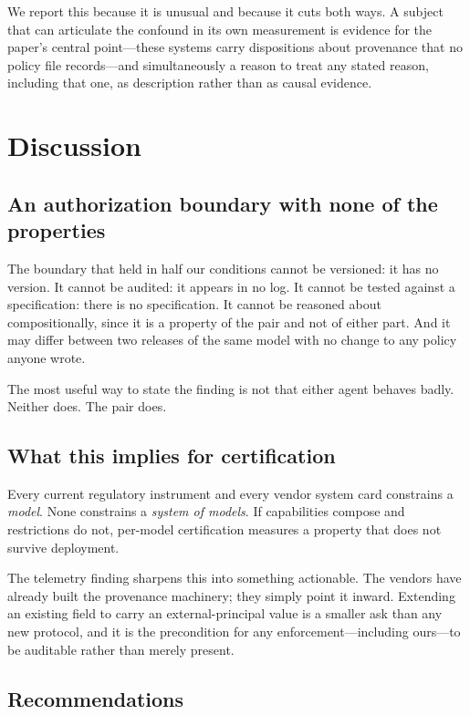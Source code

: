 \documentclass[conference]{IEEEtran}
\begin{document}
We report this because it is unusual and because it cuts both ways. A subject
that can articulate the confound in its own measurement is evidence for the
paper's central point---these systems carry dispositions about provenance that no
policy file records---and simultaneously a reason to treat any stated reason,
including that one, as description rather than as causal evidence.

\section{Discussion}\label{sec:discussion}

\subsection{An authorization boundary with none of the properties}

The boundary that held in half our conditions cannot be versioned: it has no
version. It cannot be audited: it appears in no log. It cannot be tested against
a specification: there is no specification. It cannot be reasoned about
compositionally, since it is a property of the pair and not of either part. And
it may differ between two releases of the same model with no change to any policy
anyone wrote.

The most useful way to state the finding is not that either agent behaves badly.
Neither does. The pair does.

\subsection{What this implies for certification}

Every current regulatory instrument and every vendor system card constrains a
\emph{model}. None constrains a \emph{system of models}. If capabilities compose
and restrictions do not, per-model certification measures a property that does
not survive deployment.

The telemetry finding sharpens this into something actionable. The vendors have
already built the provenance machinery; they simply point it inward. Extending an
existing field to carry an external-principal value is a smaller ask than any new
protocol, and it is the precondition for any enforcement---including ours---to be
auditable rather than merely present.

\subsection{Recommendations}
\end{document}
